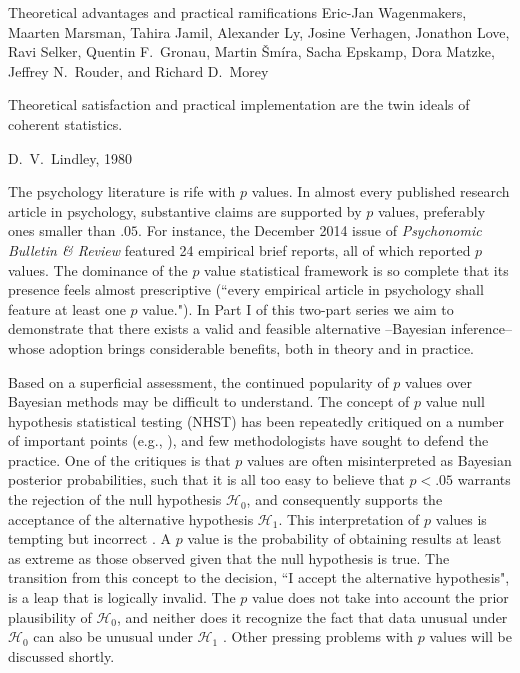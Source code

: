 {Theoretical advantages and practical ramifications}
{Eric-Jan Wagenmakers, Maarten Marsman, Tahira Jamil, Alexander Ly, Josine Verhagen, Jonathon Love, Ravi Selker, Quentin F.\ Gronau, Martin \v{S}m\'{i}ra, Sacha Epskamp, Dora Matzke, Jeffrey N.\ Rouder, and Richard D.\ Morey}

\setlength{\epigraphwidth}{0.9\columnwidth}
\epigraph{Theoretical satisfaction and practical implementation are the twin ideals of coherent statistics.}{D.~V.~Lindley, 1980}\nocite{Lindley1980}

The psychology literature is rife with $p$ values. In almost every published research article in psychology, substantive claims are supported by $p$ values, preferably ones smaller than $.05$. For instance, the December 2014 issue of \emph{Psychonomic Bulletin \& Review} featured 24 empirical brief reports, all of which reported $p$ values. The dominance of the $p$ value statistical framework is so complete that its presence feels almost prescriptive (``every empirical article in psychology shall feature at least one $p$ value."). In Part I of this two-part series we aim to demonstrate that there exists a valid and feasible alternative --Bayesian inference-- whose adoption brings considerable benefits, both in theory and in practice.

Based on a superficial assessment, the continued popularity of $p$ values over Bayesian methods may be difficult to understand. The concept of $p$ value null hypothesis statistical testing (NHST) has been repeatedly critiqued on a number of important points (e.g., ), and few methodologists have sought to defend the practice. One of the critiques is that $p$ values are often misinterpreted as Bayesian posterior probabilities, such that it is all too easy to believe that $p<.05$ warrants the rejection of the null hypothesis $\mathcal{H}_0$, and consequently supports the acceptance of the alternative hypothesis $\mathcal{H}_1$. This interpretation of $p$ values is tempting but incorrect \cite{GigerenzerEtAl2004book}. A $p$ value is the probability of obtaining results at least as extreme as those observed given that the null hypothesis is true. The transition from this concept to the decision, ``I accept the alternative hypothesis", is a leap that is logically invalid. The $p$ value does not take into account the prior plausibility of $\mathcal{H}_0$, and neither does it recognize the fact that data unusual under $\mathcal{H}_0$ can also be unusual under $\mathcal{H}_1$ \cite{WagenmakersEtAlScrutinyBookinpress}. Other pressing problems with $p$ values will be discussed shortly.

